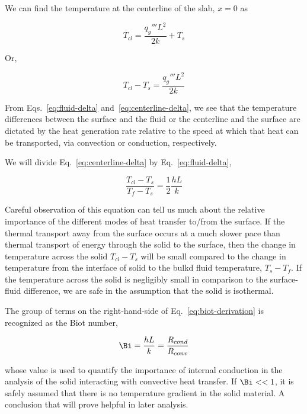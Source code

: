 We can find the temperature at the centerline of the slab, $x = 0$ as

\begin{equation}
	T_{cl} = \frac{q_g''' L^2}{2k} + T_s
\end{equation}

Or,

\begin{equation}\label{eq:centerline-delta}
	T_{cl} - T_s = \frac{q_g''' L^2}{2k}
\end{equation}

From Eqs.~\ref{eq:fluid-delta} and~\ref{eq:centerline-delta}, we see that the temperature differences between the surface and the fluid or the centerline and the surface are dictated by the heat generation rate relative to the speed at which that heat can be transported, via convection or conduction, respectively.

We will divide Eq.~\ref{eq:centerline-delta} by Eq.~\ref{eq:fluid-delta},

\begin{equation}\label{eq:biot-derivation}
	\frac{T_{cl} - T_s}{T_f-T_s} = \frac{1}{2}\frac{hL}{k}
\end{equation}

Careful observation of this equation can tell us much about the relative importance of the different modes of heat transfer to/from the surface. If the thermal transport away from the surface occurs at a much slower pace than thermal transport of energy through the solid to the surface, then the change in temperature across the solid $T_{cl}-T_{s}$ will be small compared to the change in temperature from the interface of solid to the bulkd fluid temperature, $T_{s}-T_f$. If the temperature across the solid is negligibly small in comparison to the surface-fluid difference, we are safe in the assumption that the solid is isothermal.

The group of terms on the right-hand-side of Eq.~\ref{eq:biot-derivation} is recognized as the Biot number,

\begin{equation}\label{eq:biot-number}
	\Bi=\frac{hL}{k}=\frac{R_{cond}}{R_{conv}}
\end{equation}

whose value is used to quantify the importance of internal conduction in the analysis of the solid interacting with convective heat transfer. If $\Bi<<1$, it is safely assumed that there is no temperature gradient in the solid material. A conclusion that will prove helpful in later analysis.

